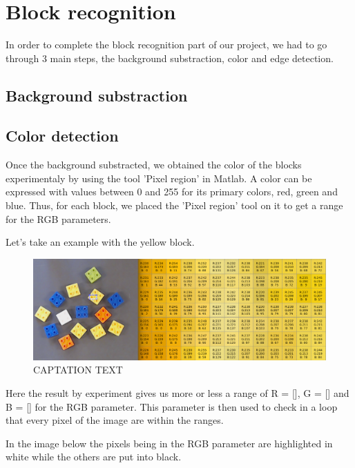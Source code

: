 
\chapter{Block recognition}\label{ch:block_recognition}

In order to complete the block recognition part of our project, we had to go through 3 main steps, the background substraction, color and edge detection.

\section{Background substraction}

\section{Color detection}

 	Once the background substracted, we obtained the color of the blocks experimentaly by using the tool 'Pixel region' in Matlab. A color can be expressed with values between 0 and 255 for its primary colors, red, green and blue. Thus, for each block, we placed the 'Pixel region' tool on it to get a range for the RGB parameters.\par
\begin{flushleft}
Let's take an example with the yellow block.
\end{flushleft} \par

\begin{figure}[hb]
  \centering
  \includegraphics[scale=0.3]{figures/Thres_Y_manualy2.png}
  \caption[LABEL] {CAPTATION TEXT}
\end{figure}

Here the result by experiment gives us more or less a range of R = [], G = [] and B = [] for the RGB parameter. This parameter is then used to check in a loop that every pixel of the image are within the ranges.\par
In the image below the pixels being in the RGB parameter are highlighted in white while the others are put into black. 

